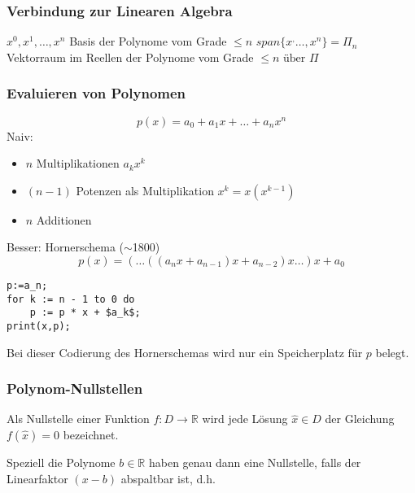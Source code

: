\subsubsection{Verbindung zur Linearen Algebra} %
\label{ssub:polyLinAlg}
\( x^0,x^1,\ldots,x^n \) Basis der Polynome vom Grade \( \leq n \) \newline
\( span\{x^,\ldots,x^n\}=\Pi_n \) Vektorraum im Reellen der Polynome vom Grade \( \leq n \text{ über } \Pi \)


\subsubsection{Evaluieren von Polynomen} %
\label{ssub:evaluieren_von_polynomen}

\[
	p(x)=a_0+a_1x+\ldots+a_nx^n
\]
Naiv:
\begin{itemize}
	\item \( n \) Multiplikationen \( a_kx^k \)
	\item \( (n-1) \) Potenzen als Multiplikation \( x^k=x(x^{k-1}) \)
	\item \( n \) Additionen
\end{itemize}

Besser: Hornerschema (\( \sim \)1800)
\[
	p(x)=(\ldots((a_nx+a_{n-1})x+a_{n-2})x\ldots)x+a_0
\]


\lstset{language=Pascal}
\begin{lstlisting}[frame=single,mathescape=true,caption="Codierung des Hornerschemas"] 
p:=a_n;
for k := n - 1 to 0 do
	p := p * x + $a_k$;
print(x,p);
\end{lstlisting}
Bei dieser Codierung des Hornerschemas wird nur ein Speicherplatz für \( p \) belegt.


\subsubsection{Polynom-Nullstellen} %
\label{ssub:polynom_nullstellen}

\begin{definition}
				Als Nullstelle einer Funktion \( f:D\rightarrow\mathbb{R} \) wird jede Lösung \( \hat{x} \in D \) der Gleichung \( f(\hat{x})=0 \) bezeichnet.
\end{definition}
\noindent Speziell die Polynome \( b \in \mathbb{R} \) haben genau dann eine Nullstelle, falls der Linearfaktor \( (x-b) \) abspaltbar ist, d.h.

